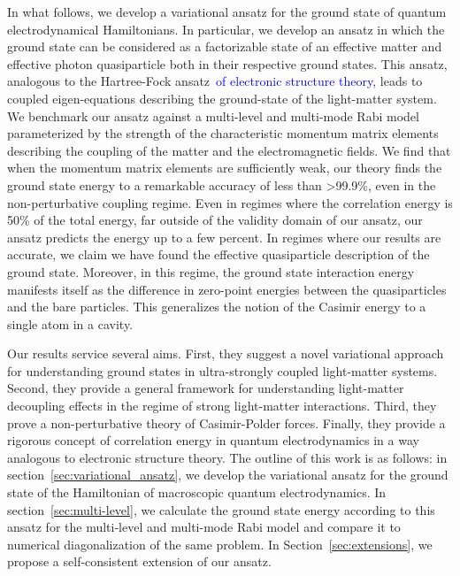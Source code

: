 \documentclass[aps,prb,twocolumn,
	groupedaddress,superscriptaddress,
	amsfonts,amssymb,amsmath,floatfix,
	citeautoscript]{revtex4-1}
\newcommand{\Jadd}[1]{\textcolor{blue}{#1}}
\begin{document}
In what follows, we develop a variational ansatz for the ground state of quantum electrodynamical Hamiltonians. In particular, we develop an ansatz in which the ground state can be considered as a factorizable state of an effective matter and effective photon quasiparticle both in their respective ground states. This ansatz, analogous to the Hartree-Fock ansatz~\Jadd{of electronic structure theory}, leads to coupled eigen-equations describing the ground-state of the light-matter system. We benchmark our ansatz against a multi-level and multi-mode Rabi model parameterized by the strength of the characteristic momentum matrix elements describing the coupling of the matter and the electromagnetic fields. We find that when the momentum matrix elements are sufficiently weak, our theory finds the ground state energy to a remarkable accuracy of less than >99.9\%, even in the non-perturbative coupling regime. Even in regimes where the correlation energy is 50\% of the total energy, far outside of the validity domain of our ansatz, our ansatz predicts the energy up to a few percent. In regimes where our results are accurate, we claim we have found the effective quasiparticle description of the ground state. Moreover, in this regime, the ground state interaction energy manifests itself as the difference in zero-point energies between the quasiparticles and the bare particles. This generalizes the notion of the Casimir energy to a single atom in a cavity.

Our results service several aims. First, they suggest a novel variational approach for understanding ground states in ultra-strongly coupled light-matter systems. Second, they provide a general framework for understanding light-matter decoupling effects in the regime of strong light-matter interactions. Third, they prove a non-perturbative theory of Casimir-Polder forces. Finally, they provide a rigorous concept of correlation energy in quantum electrodynamics in a way analogous to electronic structure theory. 
The outline of this work is as follows: in section~\ref{sec:variational_ansatz}, we develop the variational ansatz for the ground state of the Hamiltonian of macroscopic quantum electrodynamics. In section~\ref{sec:multi-level}, we calculate the ground state energy according to this ansatz for the multi-level and multi-mode Rabi model and compare it to numerical diagonalization of the same problem. In Section~\ref{sec:extensions}, we propose a self-consistent extension of our ansatz. 
\end{document}
